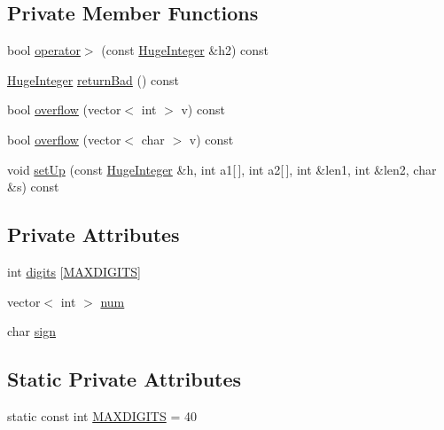 \subsection*{Private Member Functions}
\begin{DoxyCompactItemize}
\item 
bool \hyperlink{classHugeInteger_a9ea6dc20120af0710d180f7fc2f15104}{operator$>$} (const \hyperlink{classHugeInteger}{Huge\+Integer} \&h2) const 
\item 
\hyperlink{classHugeInteger}{Huge\+Integer} \hyperlink{classHugeInteger_a6d9c7e76adbd02057a8a4a1048e05870}{return\+Bad} () const 
\item 
bool \hyperlink{classHugeInteger_a714314b2e1b79827d8796d8c52016e5a}{overflow} (vector$<$ int $>$ v) const 
\item 
bool \hyperlink{classHugeInteger_a5c25f70a6d5cdb5625de8b4990555ba0}{overflow} (vector$<$ char $>$ v) const 
\item 
void \hyperlink{classHugeInteger_a2b54adddc72d21bcd72126855db96188}{set\+Up} (const \hyperlink{classHugeInteger}{Huge\+Integer} \&h, int a1\mbox{[}$\,$\mbox{]}, int a2\mbox{[}$\,$\mbox{]}, int \&len1, int \&len2, char \&s) const 
\end{DoxyCompactItemize}
\subsection*{Private Attributes}
\begin{DoxyCompactItemize}
\item 
int \hyperlink{classHugeInteger_ab0bd42ce92321df91e3a9a11897cdb8a}{digits} \mbox{[}\hyperlink{classHugeInteger_a35ff958aa09161b192b69b1de876dab3}{M\+A\+X\+D\+I\+G\+I\+TS}\mbox{]}
\item 
vector$<$ int $>$ \hyperlink{classHugeInteger_a3d21e9f761dfb49fb6559389685af830}{num}
\item 
char \hyperlink{classHugeInteger_a0ac2a85dbda0bd78e0df91fb6d6e2397}{sign}
\end{DoxyCompactItemize}
\subsection*{Static Private Attributes}
\begin{DoxyCompactItemize}
\item 
static const int \hyperlink{classHugeInteger_a35ff958aa09161b192b69b1de876dab3}{M\+A\+X\+D\+I\+G\+I\+TS} = 40
\end{DoxyCompactItemize}
